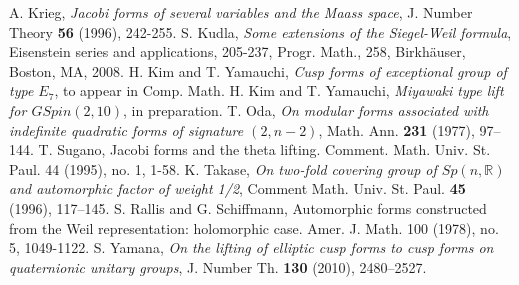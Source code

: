 \documentclass[11pt]{amsart}
\numberwithin{equation}{section}
\theoremstyle{definition}
\begin{document}
\begin{thebibliography}{99}
 A. Krieg, {\em Jacobi forms of several variables and the Maass space}, J. Number Theory {\bf 56} (1996), 242-255.
 S. Kudla, {\em Some extensions of the Siegel-Weil formula}, Eisenstein series and applications, 205-237, Progr. Math., 258, Birkh\"auser, Boston, MA, 2008.
 H. Kim and T. Yamauchi, {\em Cusp forms of exceptional group of type $E_7$}, to appear in Comp. Math.
 H. Kim and T. Yamauchi,  {\em Miyawaki type lift for $GSpin(2,10)$}, in preparation.
 T. Oda, {\em On modular forms associated with indefinite quadratic forms of signature $(2,n-2)$}, Math. Ann. {\bf 231} (1977), 97--144.
T. Sugano, Jacobi forms and the theta lifting. Comment. Math. Univ. St. Paul.  44  (1995),  no. 1, 1-58.
 K. Takase, {\em On two-fold covering group of $Sp(n,{\mathbb{R}})$ and automorphic factor of weight 1/2},
Comment Math. Univ. St. Paul. {\bf 45} (1996), 117--145.
S. Rallis and G. Schiffmann, Automorphic forms constructed from the Weil representation: holomorphic case. Amer. J. Math.  100  (1978), no. 5, 1049-1122.
 S. Yamana, {\em On the lifting of elliptic cusp forms to cusp forms on quaternionic unitary groups},
J. Number Th. {\bf 130} (2010), 2480--2527.

\end{thebibliography}
\end{document}
